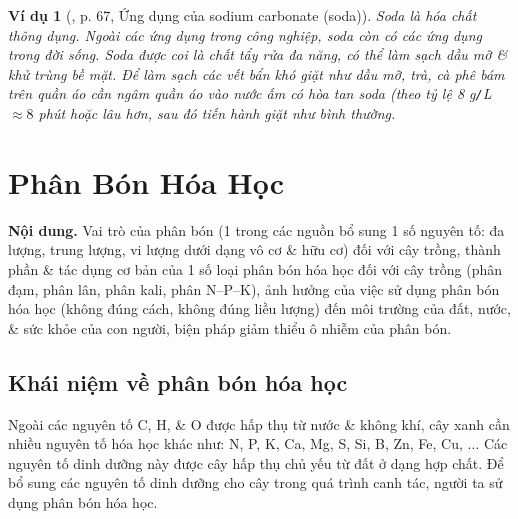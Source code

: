 \documentclass{article}
\newtheorem{vidu}{Ví dụ}
\begin{document}
\begin{vidu}[\cite{SGK_KHTN_8_Canh_Dieu},  p. 67, Ứng dụng của sodium carbonate (soda)]
	Soda là hóa chất thông dụng. Ngoài các ứng dụng trong công nghiệp, soda còn có các ứng dụng trong đời sống. Soda được coi là chất tẩy rửa đa năng, có thể làm sạch dầu mỡ \& khử trùng bề mặt. Để làm sạch các vết bẩn khó giặt như dầu mỡ, trà, cà phê bám trên quần áo cần ngâm quần áo vào nước ấm có hòa tan soda (theo tỷ lệ {\rm8 g{\tt/}L} $\approx8$ phút hoặc lâu hơn, sau đó tiến hành giặt như bình thường.
\end{vidu}
\noindent{}


\section{Phân Bón Hóa Học}
\textsf{\textbf{Nội dung.} Vai trò của phân bón (1 trong các nguồn bổ sung 1 số nguyên tố: đa lượng, trung lượng, vi lượng dưới dạng vô cơ \& hữu cơ) đối với cây trồng, thành phần \& tác dụng cơ bản của 1 số loại phân bón hóa học đối với cây trồng (phân đạm, phân lân, phân kali, phân N--P--K), ảnh hưởng của việc sử dụng phân bón hóa học (không đúng cách, không đúng liều lượng) đến môi trường của đất, nước, \& sức khỏe của con người, biện pháp giảm thiểu ô nhiễm của phân bón.}

\subsection{Khái niệm về phân bón hóa học}
Ngoài các nguyên tố C, H, \& O được hấp thụ từ nước \& không khí, cây xanh cần nhiều nguyên tố hóa học khác như: N, P, K, Ca, Mg, S, Si, B, Zn, Fe, Cu, $\ldots$ Các nguyên tố dinh dưỡng này được cây hấp thụ chủ yếu từ đất ở dạng hợp chất. Để bổ sung các nguyên tố dinh dưỡng cho cây trong quá trình canh tác, người ta sử dụng phân bón hóa học.
\end{document}
